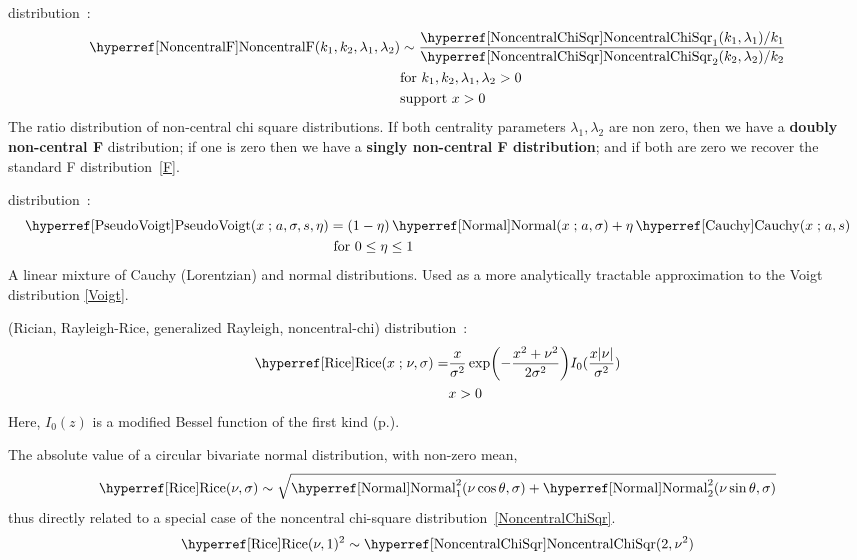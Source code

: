 \secbreak

 distribution~\cite{Fisher1928, Johnson1995}:
\begin{align}
\label{NoncentralF}
\opr{NoncentralF}(k_1,k_2,\lambda_1,\lambda_2) &\sim \frac{\opr{NoncentralChiSqr}_1(k_1,\lambda_1)/k_1 }{\opr{NoncentralChiSqr}_2(k_2,\lambda_2)/k_2 }
\checked
\notag
\\
& \text{for } k_1,k_2,\lambda_1,\lambda_2 > 0  \notag \\
& \text{support } x>0
\end{align}
The ratio distribution of non-central chi square distributions. If both centrality parameters $\lambda_1,\lambda_2$ are non zero, then we have a {\bf doubly non-central F} distribution; if one is zero then we have a {\bf singly non-central F distribution}; and if both are zero we recover the standard F distribution~\eqref{F}.




\secbreak
{} distribution~\cite{Wertheim1974}: 
\begin{align}
\label{PseudoVoigt}
\opr{PseudoVoigt}(x\given a,\sigma, s, \eta) &= (1-\eta) \opr{Normal}(x\given a,\sigma) + \eta \opr{Cauchy}(x\given a,s)
\notag \checked
\\
& \text{ for } 0\leq\eta\leq1
\end{align}
A linear mixture of Cauchy (Lorentzian) and normal distributions. Used as a more analytically tractable approximation to the Voigt distribution \eqref{Voigt}. 


\secbreak
 (Rician, Rayleigh-Rice, generalized Rayleigh, noncentral-chi) distribution~\cite{Rice1945,Talukdar1991}:
\begin{align}
\label{Rice}
\opr{Rice}(x\given \nu,\sigma) = & \frac{x}{\sigma^2} \exp\Left(-\frac{x^2+\nu^2 }{2\sigma^2}  \Right) I_0(\frac{x |\nu|}{\sigma^2})
\checked
\\ 
& x>0 \notag
\end{align}
Here, $I_0(z)$ is a modified Bessel function of the first kind (p.\pageref{ModBesselFirst}). 

The absolute value of a circular bivariate normal distribution, with non-zero mean,
\[
\opr{Rice}(\nu,\sigma) \sim \sqrt{\opr{Normal}^2_1(\nu \cos \theta,\sigma)  +\opr{Normal}^2_2(\nu \sin \theta,\sigma)   }
\checked \notag
\]
thus directly related to a special case of the noncentral chi-square distribution~\eqref{NoncentralChiSqr}. 
\[
\opr{Rice}(\nu,1)^2 \sim  \opr{NoncentralChiSqr}(2,\nu^2) \checked
\notag
\]

